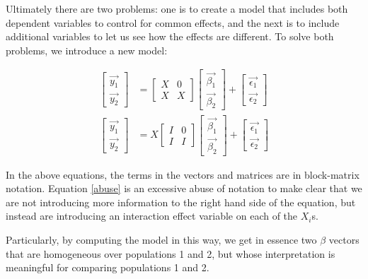 Ultimately there are two problems: one is to create a model that includes both dependent variables to control for common effects, and the next is to include additional variables to let us see how the effects are different. To solve both problems, we introduce a new model:

\begin{align}
\left[\begin{array}{c} \vec{y_1} \\ \vec{y_2} \end{array} \right] 
&= 
\left[\begin{array}{cc} X & 0 \\ X & X \end{array}\right]
\left[\begin{array}{c} \vec{\beta_1} \\ \vec{\beta_2} \end{array} \right]
+ 
\left[\begin{array}{c} \vec{\epsilon_1} \\ \vec{\epsilon_2} \end{array} \right]
\\
\left[\begin{array}{c} \vec{y_1} \\ \vec{y_2} \end{array} \right] 
&= 
X\left[\begin{array}{cc} I & 0 \\ I & I \end{array}\right]
\left[\begin{array}{c} \vec{\beta_1} \\ \vec{\beta_2} \end{array} \right]
+ 
\left[\begin{array}{c} \vec{\epsilon_1} \\ \vec{\epsilon_2} \end{array} \right] \label{abuse}
\end{align}

In the above equations, the terms in the vectors and matrices are in block-matrix notation. Equation \ref{abuse} is an excessive abuse of notation to make clear that we are not introducing more information to the right hand side of the equation, but instead are introducing an interaction effect variable on each of the $X_i$s. 

Particularly, by computing the model in this way, we get in essence two $\beta$ vectors that are homogeneous over populations 1 and 2, but whose interpretation is meaningful for comparing populations 1 and 2. 

